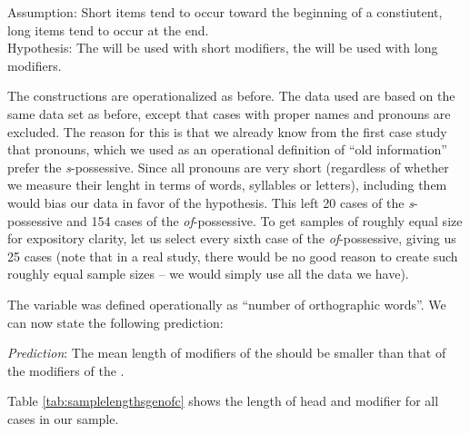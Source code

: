 \begin{exe}
\ex Assumption: Short items tend to occur toward the beginning of a constiutent, long items tend to occur at the end. \\
Hypothesis: The  will be used with short modifiers, the  will be used with long modifiers.
\label{ex:lengthhypothesis}
\end{exe}

The constructions are operationalized as before. The data used are based on the same data set as before, except that cases with proper names and pronouns are excluded. The reason for this is that we already know from the first case study that pronouns, which we used as an operational definition of ``old information'' prefer the \textit{s}-possessive. Since all pronouns are very short (regardless of whether we measure their lenght in terms of words, syllables or letters), including them would bias our data in favor of the hypothesis. This left 20 cases of the \textit{s}-possessive and 154 cases of the \textit{of}-possessive. To get samples of roughly equal size for expository clarity, let us select every sixth case of the \textit{of}-possessive, giving us 25 cases (note that in a real study, there would be no good reason to create such roughly equal sample sizes -- we would simply use all the data we have).

The variable  was defined operationally as ``number of orthographic words''. We can now state the following prediction:

\begin{exe}
\ex \textit{Prediction}: The mean length of modifiers of the  should be smaller than that of the modifiers of the .
\label{ex:lengthprediction}
\end{exe}

Table \ref{tab:samplelengthsgenofc} shows the length of head and modifier for all cases in our sample.

